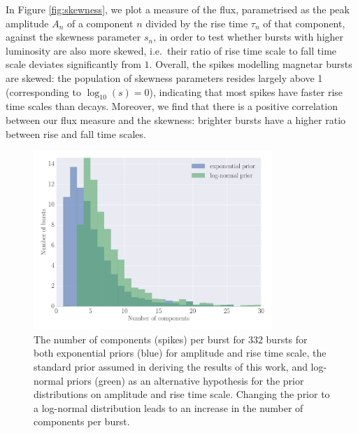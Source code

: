 \documentclass[12pt]{emulateapj}
\begin{document}
In Figure \ref{fig:skewness}, we plot a measure of the flux, parametrised as the peak amplitude $A_n$ of a component $n$ divided by the rise time $\tau_n$ of that component,
against the skewness parameter $s_n$, in order to test whether bursts with higher luminosity are also more skewed, i.e.\ their ratio of rise time scale to fall time scale deviates significantly
from $1$. Overall, the spikes modelling magnetar bursts are skewed: the population of skewness parameters resides largely above 1 (corresponding to $\log_{10}{(s)} = 0$), indicating that most
spikes have faster rise time scales than decays. Moreover, we find that there is a positive correlation between  our flux measure and the skewness: brighter bursts have a higher
ratio between rise and fall time scales. %



 \begin{figure}[htbp]
\begin{center}
\includegraphics[width=9cm]{f9.pdf}%
\caption{The number of  components (spikes) per burst for $332$ bursts for both exponential priors (blue) for amplitude and rise time scale, the standard prior assumed in
deriving the results of this work, and log-normal priors (green) as an alternative hypothesis for the prior distributions on amplitude and rise time scale. Changing the prior to a log-normal
distribution leads to an increase in the number of components per burst.}
\label{fig:nspikes_prior}
\end{center}
\end{figure}
\end{document}
